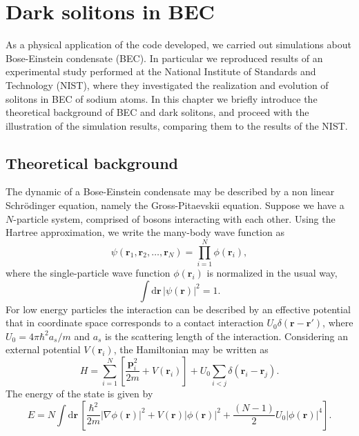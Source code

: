 \chapter{Dark solitons in BEC}
As a physical application of the code developed, we carried out simulations about Bose-Einstein condensate (BEC). In particular we reproduced results of an experimental study performed at the National Institute of Standards and Technology (NIST), where they investigated the realization and evolution of solitons in BEC of sodium atoms.
 In this chapter we briefly introduce the theoretical background of BEC and dark solitons, and proceed with the illustration of the simulation results, comparing them to the results of the NIST.

\section{Theoretical background}
The dynamic of a Bose-Einstein condensate may be described by a non linear Schr\"odinger equation, namely the Gross-Pitaevskii equation. Suppose we have a $N$-particle system, comprised of bosons interacting with each other. Using the Hartree approximation, we write the many-body wave function as
\begin{equation}
\psi(\textbf{r}_1, \textbf{r}_2,\ldots, \textbf{r}_N) = \prod_{i=1}^N \phi(\textbf{r}_i),
\end{equation}
where the single-particle wave function $\phi(\textbf{r}_i)$ is normalized in the usual way,
\begin{equation}
\int \mathrm{d}\textbf{r} \, |\psi(\textbf{r})|^2 = 1.
\end{equation} 
For low energy particles the interaction can be described by an effective potential %
that in coordinate space corresponds to a contact interaction $U_0 \delta(\textbf{r} - \textbf{r}')$, where $U_0 = 4 \pi \hbar^2 a_s / m$ and $a_s$ is the scattering length of the interaction. Considering an external potential $V(\textbf{r}_i)$, the Hamiltonian may be written as
\begin{equation}
H = \sum_{i=1}^N \left[ \frac{\textbf{p}_i^2}{2 m} + V(\textbf{r}_i) \right] + U_0 \sum_{i<j} \delta(\textbf{r}_i - \textbf{r}_j).
\end{equation}
The energy of the state is given by
\begin{equation}
E =  N \int \mathrm{d} \textbf{r} \, \left[ \frac{\hbar^2}{2m} |\nabla \phi(\textbf{r}) |^2 + V(\textbf{r}) |\phi(\textbf{r})|^2 + \frac{(N-1)}{2} U_0 |\phi(\textbf{r})|^4 \right].
\end{equation} 
